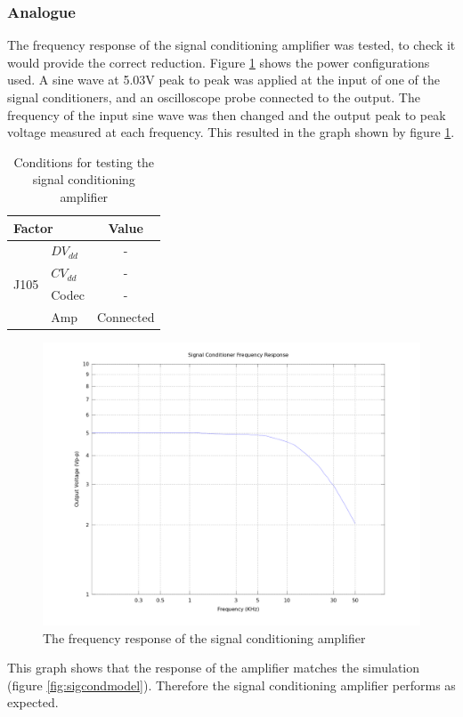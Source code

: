 \subsubsection{Analogue}
The frequency response of the signal conditioning amplifier was tested, to check it would provide the correct reduction.
Figure \ref{tab:analoguetestconditions} shows the power configurations used.
A sine wave at 5.03V peak to peak was applied at the input of one of the signal conditioners, and an oscilloscope probe connected to the output.
The frequency of the input sine wave was then changed and the output peak to peak voltage measured at each frequency.
This resulted in the graph shown by figure \ref{fig:sigcondtest}.

\begin{table}[H]
	\centering
	\begin{tabular}[c]{| l | l | c |}
		\hline
		\multicolumn{2}{|l|}{Factor}		& Value	\\
		\hline
		\multirow{4}{*}{J105}	& $DV_{dd}$	& -		\\
					& $CV_{dd}$	& -		\\
					& Codec		& -		\\
					& Amp		& Connected	\\
		\hline
	\end{tabular}
	\caption{Conditions for testing the signal conditioning amplifier}
	\label{tab:analoguetestconditions}
\end{table}

\begin{figure}
	\centering
	\includegraphics[width=\textwidth]{./img/sigcondtest.png}
	\caption{The frequency response of the signal conditioning amplifier}
	\label{fig:sigcondtest}
\end{figure}

\noindent This graph shows that the response of the amplifier matches the simulation (figure \ref{fig:sigcondmodel}).
Therefore the signal conditioning amplifier performs as expected.
